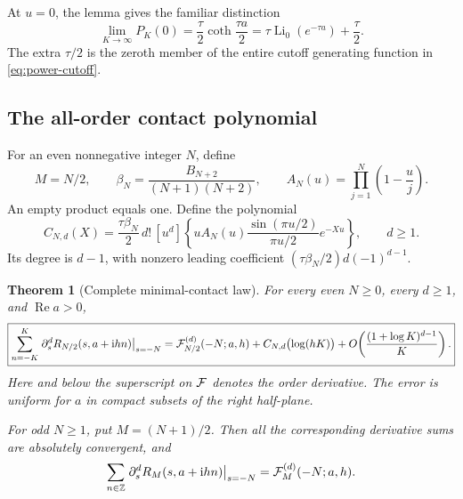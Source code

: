 \documentclass[11pt,letterpaper]{article}
\numberwithin{equation}{section}
\newtheorem{theorem}{Theorem}[section]
\theoremstyle{definition}
\theoremstyle{remark}
\DeclareMathOperator{\Li}{Li}
\DeclareMathOperator{\Ree}{Re}
\newcommand{\ii}{\mathrm i}
\begin{document}
At \(u=0\), the lemma gives the familiar distinction
\[
 \lim_{K\to\infty}P_K(0)
 =\frac{\tau}{2}\coth\frac{\tau a}{2}
 =\tau\Li_0(e^{-\tau a})+\frac{\tau}{2}.
\]
The extra \(\tau/2\) is the zeroth member of the entire cutoff
generating function in \eqref{eq:power-cutoff}.

\subsection{The all-order contact polynomial}

For an even nonnegative integer \(N\), define
\begin{equation}\label{eq:root-beta}
 M=N/2,\qquad
 \beta_N=\frac{B_{N+2}}{(N+1)(N+2)},\qquad
 A_N(u)=\prod_{j=1}^{N}\left(1-\frac uj\right).
\end{equation}
An empty product equals one. Define the polynomial
\begin{equation}\label{eq:contact-polynomial}
 \boxed{\displaystyle
 C_{N,d}(X)=
  \frac{\tau\beta_N}{2}\,d!\,[u^d]\!
  \left\{uA_N(u)\frac{\sin(\pi u/2)}{\pi u/2}e^{-Xu}\right\},
  \qquad d\geq1.}
\end{equation}
Its degree is \(d-1\), with nonzero leading coefficient
\((\tau\beta_N/2)d(-1)^{d-1}\).

\begin{theorem}[Complete minimal-contact law]\label{thm:minimal-contact}
For every even \(N\geq0\), every \(d\geq1\), and \(\Ree a>0\),
\begin{equation}\label{eq:minimal-contact}
 \boxed{\displaystyle
 \sum_{n=-K}^{K}
   \left.\partial_s^dR_{N/2}(s,a+\ii hn)\right|_{s=-N}
 =
 {\cal F}_{N/2}^{(d)}(-N;a,h)
 +C_{N,d}\bigl(\log(hK)\bigr)
 +O\!\left(\frac{(1+\log K)^{d-1}}K\right).}
\end{equation}
Here and below the superscript on \({\cal F}\) denotes the order
derivative. The error is uniform for \(a\) in compact subsets of
the right half-plane.

For odd \(N\geq1\), put \(M=(N+1)/2\). Then all the corresponding
derivative sums are absolutely convergent, and
\begin{equation}\label{eq:odd-all-jets}
 \sum_{n\in\mathbb Z}
 \left.\partial_s^dR_M(s,a+\ii hn)\right|_{s=-N}
 ={\cal F}_M^{(d)}(-N;a,h).
\end{equation}
\end{theorem}
\end{document}

